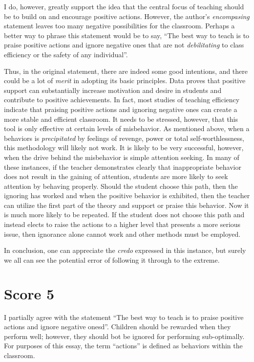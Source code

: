 I do, however, greatly support the idea that the central focus of teaching should be to build on and encourage positive actions.
However, the author's \emph{encompasing} statement leaves too many negative possibilities for the classroom.
Perhaps a better way to phrase this statement would be to say, ``The best way to teach is to praise positive actions and ignore negative ones that are not \emph{debilitating} to class efficiency or the safety of any individual''.

Thus, in the original statement, there are indeed some good intentions, and there could be a lot of \emph{merit} in adopting its basic principles.
Data proves that positive support can substantially increase motivation and desire in students and contribute to positive achievements.
In fact, most studies of teaching efficiency indicate that praising positive actions and ignoring negative ones can create a more stable and efficient classroom.
It needs to be stressed, however, that this tool is only effective at certain levels of misbehavior.
As mentioned above, when a behaviors is \emph{precipitated} by feelings of revenge, power or total self-worthlessness, this methodology will likely not work.
It is likely to be very successful, however, when the drive behind the misbehavior is simple attention seeking.
In many of these instances, if the teacher demonstrates clearly that inappropriate behavior does not result in the gaining of attention, students are more likely to seek attention by behaving properly.
Should the student choose this path, then the ignoring has worked and when the positive behavior is exhibited, then the teacher can utilize the first part of the theory and support or praise this behavior.
Now it is much more likely to be repeated.
If the student does not choose this path and instead elects to raise the actions to a higher level that presents a more serious issue, then ignorance alone cannot work and other methods must be employed.

In conclusion, one can appreciate the \emph{credo} expressed in this instance, but surely we all can see the potential error of following it through to the extreme.





\section{Score 5}
I partially agree with the statement ``The best way to teach is to praise positive actions and ignore negative onesd''.
Children should be rewarded when they perform well;
however, they should bot be ignored for performing sub-optimally.
For purposes of this essay, the term ``actions'' is defined as behaviors within the classroom.

